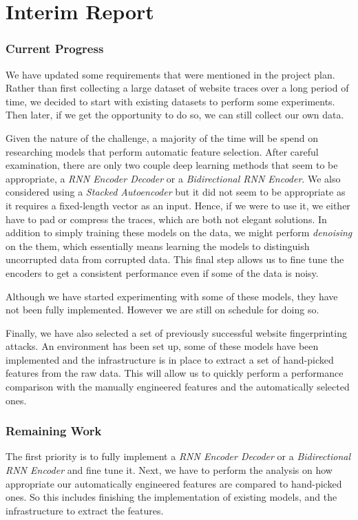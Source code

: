 \newpage
\chapter{Interim Report}

\begingroup

\renewcommand{\thesubsection}{\arabic{subsection}}

\renewcommand{\addcontentsline}[3]{}%

\subsection{Current Progress}
We have updated some requirements that were mentioned in the project plan.
Rather than first collecting a large dataset of website traces over a long period of time,
we decided to start with existing datasets to perform some experiments. Then later, if we get the opportunity to do so, we can still collect our own data.

Given the nature of the challenge, a majority of the time will be spend on researching models that perform automatic feature selection.
After careful examination, there are only two couple deep learning methods that seem to be appropriate, a \textit{RNN Encoder Decoder} or a \textit{Bidirectional RNN Encoder}.
We also considered using a \textit{Stacked Autoencoder}  but it did not seem to be appropriate as it requires a fixed-length vector as an input.
Hence, if we were to use it, we either have to pad or compress the traces, which are both not elegant solutions.
In addition to simply training these models on the data, we might perform \textit{denoising} on the them, which essentially means learning the models to distinguish uncorrupted data from corrupted data.
This final step allows us to fine tune the encoders to get a consistent performance even if some of the data is noisy.

Although we have started experimenting with some of these models, they have not been fully implemented.
However we are still on schedule for doing so.

Finally, we have also selected a set of previously successful website fingerprinting attacks.
An environment has been set up, some of these models have been implemented and the infrastructure is in place to extract a set of hand-picked features from the raw data.
This will allow us to quickly perform a performance comparison with the manually engineered features and the automatically selected ones.

\subsection{Remaining Work}
The first priority is to fully implement a \textit{RNN Encoder Decoder} or a \textit{Bidirectional RNN Encoder} and fine tune it.
Next, we have to perform the analysis on how appropriate our automatically engineered features are compared to hand-picked ones.
So this includes finishing the implementation of existing models, and the infrastructure to extract the features.

